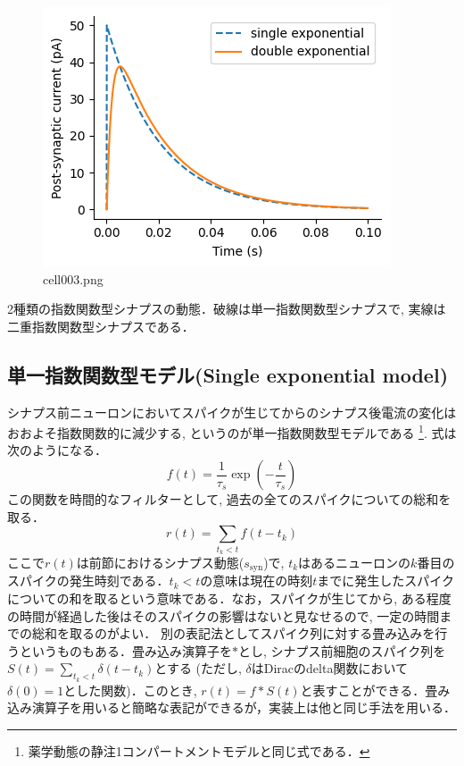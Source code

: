 \begin{figure}[ht]
	\centering
	\includegraphics[scale=0.8, max width=\linewidth]{./fig/synapse-model/expo-synapse/cell003.png}
	\caption{cell003.png}
	\label{cell003.png}
\end{figure}
2種類の指数関数型シナプスの動態．破線は単一指数関数型シナプスで, 実線は二重指数関数型シナプスである．
\subsection{単一指数関数型モデル(Single exponential model)}
シナプス前ニューロンにおいてスパイクが生じてからのシナプス後電流の変化はおおよそ指数関数的に減少する, というのが単一指数関数型モデルである 
\footnote{薬学動態の静注1コンパートメントモデルと同じ式である．}. 式は次のようになる．
\begin{equation}
f(t)=\frac{1}{\tau_{s}}\exp\left(-\frac{t}{\tau_s}\right)    
\end{equation}
この関数を時間的なフィルターとして, 過去の全てのスパイクについての総和を取る．
\begin{equation}
r(t)=\sum_{t_{k}< t} f\left(t-t_{k}\right)
\end{equation}
ここで${r(t)}$は前節におけるシナプス動態($s_{\text{syn}}$)で, $t_{k}$はあるニューロンの$k$番目のスパイクの発生時刻である．${t_{k}<t}$の意味は現在の時刻$t$までに発生したスパイクについての和を取るという意味である．なお，スパイクが生じてから, ある程度の時間が経過した後はそのスパイクの影響はないと見なせるので, 一定の時間までの総和を取るのがよい．
別の表記法としてスパイク列に対する畳み込みを行うというものもある．畳み込み演算子を$*$とし, シナプス前細胞のスパイク列を$S(t)=\sum_{t_{k}< t} \delta\left(t-t_{k}\right)$とする (ただし, $\delta$はDiracのdelta関数において$\delta(0)=1$とした関数)．このとき, $r(t)=f*S(t)$と表すことができる．畳み込み演算子を用いると簡略な表記ができるが，実装上は他と同じ手法を用いる．
